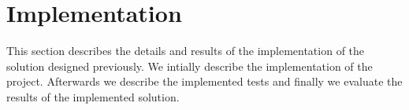 
\section{Implementation}

This section describes the details and results of the implementation of the solution designed previously. We intially describe the implementation of the project. Afterwards we describe the implemented tests and finally we evaluate the results of the implemented solution.





